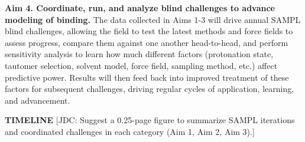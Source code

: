 \documentclass[11pt]{article}
\begin{document}
{\bf Aim 4. Coordinate, run, and analyze blind challenges to advance modeling of binding.}
The data collected in Aims 1-3 will drive annual SAMPL blind challenges, allowing the field to test the latest methods and force fields to assess progress, compare them against one another head-to-head, and perform sensitivity analysis to learn how much different factors (protonation state, tautomer selection, solvent model, force field, sampling method, etc.) affect predictive power. Results will then feed back into improved treatment of these factors for subsequent challenges, driving regular cycles of application, learning, and advancement.




{\bf \large TIMELINE} %
{\color{red}[JDC: Suggest a 0.25-page figure to summarize SAMPL iterations and coordinated challenges in each category (Aim 1, Aim 2, Aim 3).]}
\end{document}
